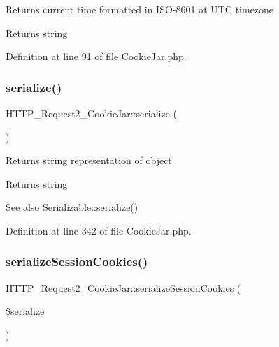 Returns current time formatted in I\+S\+O-\/8601 at U\+TC timezone

\begin{DoxyReturn}{Returns}
string 
\end{DoxyReturn}


Definition at line 91 of file Cookie\+Jar.\+php.

\hypertarget{classHTTP__Request2__CookieJar_ac6fa68d8621d1aef56c0eb8231612839}{}\label{classHTTP__Request2__CookieJar_ac6fa68d8621d1aef56c0eb8231612839} 
\subsubsection{\texorpdfstring{serialize()}{serialize()}}
{\footnotesize\ttfamily H\+T\+T\+P\+\_\+\+Request2\+\_\+\+Cookie\+Jar\+::serialize (\begin{DoxyParamCaption}{ }\end{DoxyParamCaption})}

Returns string representation of object

\begin{DoxyReturn}{Returns}
string
\end{DoxyReturn}
\begin{DoxySeeAlso}{See also}
Serializable\+::serialize() 
\end{DoxySeeAlso}


Definition at line 342 of file Cookie\+Jar.\+php.

\hypertarget{classHTTP__Request2__CookieJar_a2a81535d5a9762c3d6ae9229f2349813}{}\label{classHTTP__Request2__CookieJar_a2a81535d5a9762c3d6ae9229f2349813} 
\subsubsection{\texorpdfstring{serialize\+Session\+Cookies()}{serializeSessionCookies()}}
{\footnotesize\ttfamily H\+T\+T\+P\+\_\+\+Request2\+\_\+\+Cookie\+Jar\+::serialize\+Session\+Cookies (\begin{DoxyParamCaption}\item[{}]{\$serialize }\end{DoxyParamCaption})}

